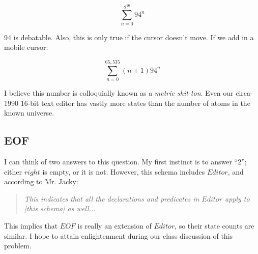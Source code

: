 \documentclass[11pt]{article}
\begin{document}
\begin{equation*}
  \sum_{n=0}^{2^{16}} 94^n
\end{equation*}

{\color{orange}
  94 is debatable. Also, this is only true if the cursor doesn't move. If we add in a mobile cursor:

  \begin{equation*}
    \sum_{n=0}^{65,535} (n+1)94^n
  \end{equation*}
}

I believe this number is colloquially known as a \textit{metric shit-ton}.  Even our circa-1990
16-bit text editor has vastly more states than the number of atoms in the known
universe\footnotemark.  


\subsection{EOF}

I can think of two answers to this question.  My first instinct is to answer ``2''; either $right$
is empty, or it is not.  However, this schema includes $Editor$, and according to Mr. Jacky:

\begin{quote}
  \textit{This indicates that all the declarations and predicates in $Editor$ apply to [this schema] as well...}
\end{quote}

This implies that $EOF$ is really an extension of $Editor$, so their state counts are similar.  I
hope to attain enlightenment during our class discussion of this problem.
\end{document}
